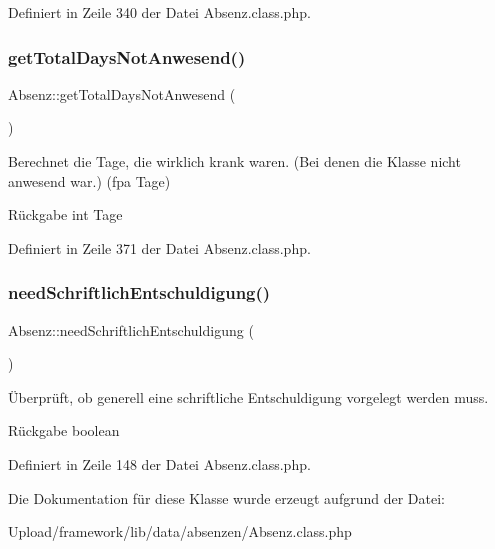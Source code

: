 Definiert in Zeile 340 der Datei Absenz.\+class.\+php.

\mbox{\label{class_absenz_a9030257dc4b61f6a08cf2590d030cfce}} 
\subsubsection{\texorpdfstring{get\+Total\+Days\+Not\+Anwesend()}{getTotalDaysNotAnwesend()}}
{\footnotesize\ttfamily Absenz\+::get\+Total\+Days\+Not\+Anwesend (\begin{DoxyParamCaption}{ }\end{DoxyParamCaption})}

Berechnet die Tage, die wirklich krank waren. (Bei denen die Klasse nicht anwesend war.) (fpa Tage) \begin{DoxyReturn}{Rückgabe}
int Tage 
\end{DoxyReturn}


Definiert in Zeile 371 der Datei Absenz.\+class.\+php.

\mbox{\label{class_absenz_aaadea2d4bccd3d3fdfcaf1e1d23687a8}} 
\subsubsection{\texorpdfstring{need\+Schriftlich\+Entschuldigung()}{needSchriftlichEntschuldigung()}}
{\footnotesize\ttfamily Absenz\+::need\+Schriftlich\+Entschuldigung (\begin{DoxyParamCaption}{ }\end{DoxyParamCaption})}

Überprüft, ob generell eine schriftliche Entschuldigung vorgelegt werden muss.

\begin{DoxyReturn}{Rückgabe}
boolean 
\end{DoxyReturn}


Definiert in Zeile 148 der Datei Absenz.\+class.\+php.



Die Dokumentation für diese Klasse wurde erzeugt aufgrund der Datei\+:\begin{DoxyCompactItemize}
\item 
Upload/framework/lib/data/absenzen/Absenz.\+class.\+php\end{DoxyCompactItemize}

